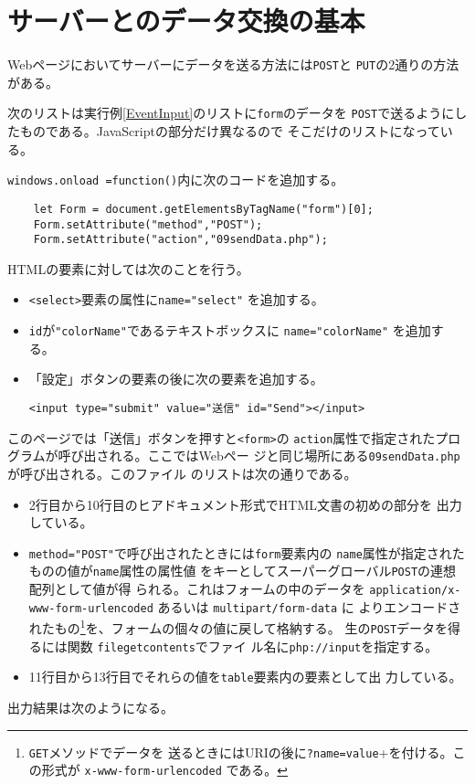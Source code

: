 \section{サーバーとのデータ交換の基本}
\iftrue
Webページにおいてサーバーにデータを送る方法には\texttt{POST}と
\texttt{PUT}の2通りの方法がある。
\begin{Exec}\upshape\label{dataexchange}
 次のリストは実行例\ref{EventInput}のリストに\texttt{form}のデータを
 \texttt{POST}で送るようにしたものである。JavaScriptの部分だけ異なるので
 そこだけのリストになっている。

\texttt{windows.onload =function()}内に次のコードを追加する。
\begin{Verbatim}
    let Form = document.getElementsByTagName("form")[0];
    Form.setAttribute("method","POST");
    Form.setAttribute("action","09sendData.php");
\end{Verbatim}
HTMLの要素に対しては次のことを行う。
\begin{itemize}
 \item \texttt{<select>}要素の属性に\Verb+name="select"+ を追加する。
 \item \texttt{id}が\Verb+"colorName"+であるテキストボックスに
       \Verb+name="colorName"+ を追加する。
 \item 「設定」ボタンの要素の後に次の要素を追加する。
\begin{center}
\Verb+<input type="submit" value="送信" id="Send"></input>+ 
\end{center}
\end{itemize}
このページでは「送信」ボタンを押すと\texttt{<form>}の
\texttt{action}属性で指定されたプログラムが呼び出される。ここではWebペー
 ジと同じ場所にある\texttt{09sendData.php}が呼び出される。このファイル
 のリストは次の通りである。
 \newcommand{\POST}{\texttt{\textdollar\textunderscore POST}}
\begin{itemize}
 \item 2行目から10行目のヒアドキュメント形式でHTML文書の初めの部分を
       出力している。
 \item \Verb+method="POST"+で呼び出されたときには\texttt{form}要素内の
       \texttt{name}属性が指定されたものの値が\texttt{name}属性の属性値
       をキーとしてスーパーグローバル\POST の連想配列として値が得
       られる。これはフォームの中のデータを
       \texttt{application/x-www-form-urlencoded} あるいは
       \texttt{multipart/form-data} に
       よりエンコードされたもの\footnote{\protect\texttt{GET}メソッドでデータを
       送るときにはURIの後に\protect\texttt{?name=value}+を付ける。この形式が
       \protect\texttt{x-www-form-urlencoded} である。}を、フォームの個々の値に戻して格納する。
       生の\POST データを得るには関数
       \texttt{file\textunderscore get\textunderscore contents}でファイ
       ル名に\texttt{php://input}を指定する。
 \item 11行目から13行目でそれらの値を\texttt{table}要素内の要素として出
       力している。
\end{itemize}
出力結果は次のようになる。
\end{Exec}
